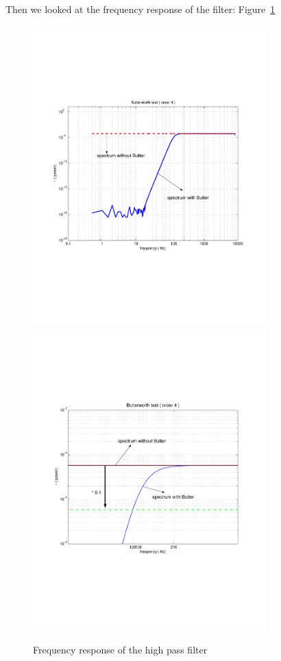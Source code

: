 Then we looked at the frequency response of the filter: 
Figure~\ref{fig:butterworthtest4}
\begin{figure}[h]
\centering
\includegraphics[width=0.8\textwidth]{figures/butterworthtest4}
\includegraphics[width=0.8\textwidth]{figures/testattenuation4}
\caption{Frequency response of the high pass filter} \label{fig:butterworthtest4} 
\end{figure}

